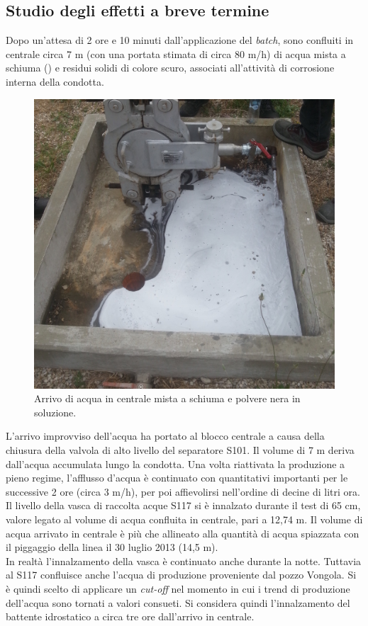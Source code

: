 \subsection{Studio degli effetti a breve termine}
Dopo un'attesa di 2 ore e 10 minuti dall'applicazione del \textit{batch}, sono confluiti in centrale circa 7 m (con una portata stimata di circa 80 m/h) di acqua mista a schiuma () e residui solidi di colore scuro, associati all'attività di corrosione interna della condotta.
\begin{figure}[htbp]
    \centering
    \includegraphics[width=.5\textwidth]{fig/test/arrivo-centrale}
    \caption{Arrivo di acqua in centrale mista a schiuma e polvere nera in soluzione.} 
    \label{fig:test-arrivocentrale}
\end{figure}
L'arrivo improvviso dell'acqua ha portato al blocco centrale a causa della chiusura della valvola di alto livello del separatore S101. Il volume di 7 m deriva dall'acqua accumulata lungo la condotta. Una volta riattivata la produzione a pieno regime, l'afflusso d'acqua è continuato con quantitativi importanti per le successive 2 ore (circa 3 m/h), per poi affievolirsi nell'ordine di decine di litri ora. Il livello della vasca di raccolta acque S117 si è innalzato durante il test di 65 cm, valore legato al volume di acqua confluita in centrale, pari a 12,74 m. Il volume di acqua arrivato in centrale è più che allineato alla quantità di acqua spiazzata con il piggaggio della linea il 30 luglio 2013 (14,5 m).\\
In realtà l'innalzamento della vasca è continuato anche durante la notte. Tuttavia al S117 confluisce anche l'acqua di produzione proveniente dal pozzo Vongola. Si è quindi scelto di applicare un \textit{cut-off} nel momento in cui i trend di produzione dell'acqua sono tornati a valori consueti. Si considera quindi l'innalzamento del battente idrostatico a circa tre ore dall'arrivo in centrale.\\
